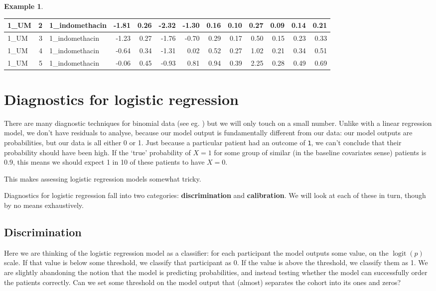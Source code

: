\documentclass[
  openany]{book}
\theoremstyle{definition}
\theoremstyle{definition}
\newtheorem{example}{Example}[chapter]
\theoremstyle{definition}
\theoremstyle{definition}
\theoremstyle{remark}
\begin{document}
\begin{example}
\begin{table}
\begin{tabular}{l|r|l|r|r|r|r|r|r|r|r|r|r}
\hline
1\_UM & 2 & 1\_indomethacin & -1.81 & 0.26 & -2.32 & -1.30 & 0.16 & 0.10 & 0.27 & 0.09 & 0.14 & 0.21\\
\hline
1\_UM & 3 & 1\_indomethacin & -1.23 & 0.27 & -1.76 & -0.70 & 0.29 & 0.17 & 0.50 & 0.15 & 0.23 & 0.33\\
\hline
1\_UM & 4 & 1\_indomethacin & -0.64 & 0.34 & -1.31 & 0.02 & 0.52 & 0.27 & 1.02 & 0.21 & 0.34 & 0.51\\
\hline
1\_UM & 5 & 1\_indomethacin & -0.06 & 0.45 & -0.93 & 0.81 & 0.94 & 0.39 & 2.25 & 0.28 & 0.49 & 0.69\\
\hline
\end{tabular}
\end{table}

\end{example}

\section{Diagnostics for logistic regression}\label{diaglogreg}

There are many diagnostic techniques for binomial data (see eg. \citet{collett_bin}) but we will only touch on a small number. Unlike with a linear regression model, we don't have residuals to analyse, because our model output is fundamentally different from our data: our model outputs are probabilities, but our data is all either 0 or 1. Just because a particular patient had an outcome of \texttt{1}, we can't conclude that their probability should have been high. If the `true' probability of \(X=1\) for some group of similar (in the baseline covariates sense) patients is 0.9, this means we should expect 1 in 10 of these patients to have \(X=0\).

This makes assessing logistic regression models somewhat tricky.

Diagnostics for logistic regression fall into two categories: \textbf{discrimination} and \textbf{calibration}. We will look at each of these in turn, though by no means exhaustively.

\subsection{Discrimination}\label{discrimination}

Here we are thinking of the logistic regression model as a classifier: for each participant the model outputs some value, on the \(\operatorname{logit}\left(p\right)\) scale. If that value is below some threshold, we classify that participant as 0. If the value is above the threshold, we classify them as 1. We are slightly abandoning the notion that the model is predicting probabilities, and instead testing whether the model can successfully order the patients correctly. Can we set some threshold on the model output that (almost) separates the cohort into its ones and zeros?
\end{document}
